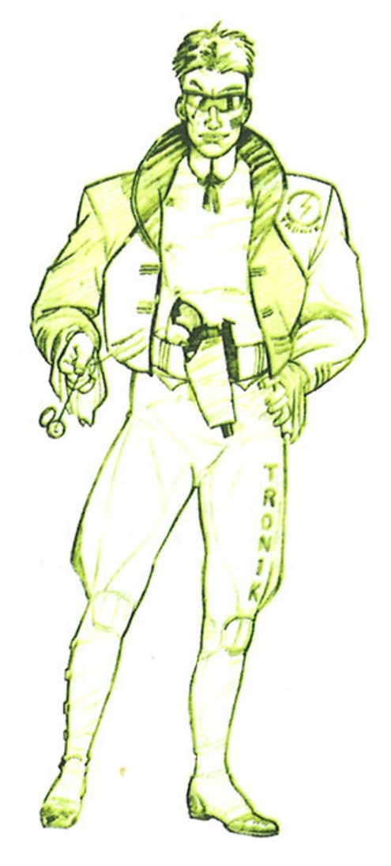\documentclass[40pt,twoside,a4paper]{article}
\begin{document}
\begin{landscape}
\begin{minipage}[ht]{0.10\textwidth}
			\includegraphics[width=0.95\textwidth]{img/personnageJeremiahSteel.jpg} ~\\~\\
		\end{minipage} ~\\

\end{landscape}
\end{document}
